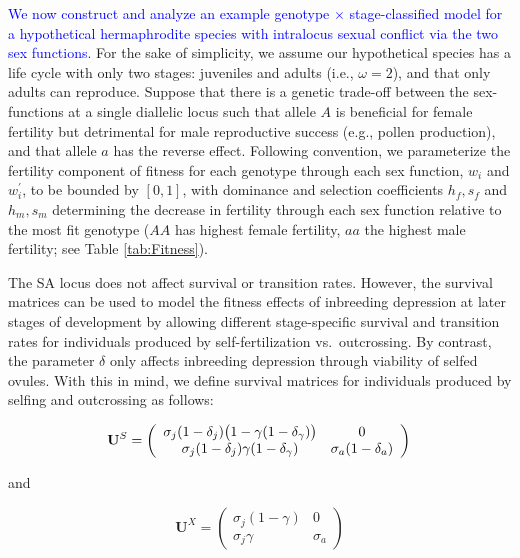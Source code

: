 \documentclass[11pt]{article}
\def\mbf#1{\mathbf{#1}}
\begin{document}
\textcolor{blue}{We now construct and analyze an example genotype $\times$ stage-classified model for a hypothetical hermaphrodite species with intralocus sexual conflict via the two sex functions.} For the sake of simplicity, we assume our hypothetical species has a life cycle with only two stages: juveniles and adults (i.e., $\omega = 2$), and that only adults can reproduce. Suppose that there is a genetic trade-off between the sex-functions at a single diallelic locus such that allele $A$ is beneficial for female fertility but detrimental for male reproductive success (e.g., pollen production), and that allele $a$ has the reverse effect. Following convention, we parameterize the fertility component of fitness for each genotype through each sex function, $w_{i}$ and $w^{\prime}_{i}$, to be bounded by $[0,1]$, with dominance and selection coefficients $h_f, s_f$ and $h_m, s_m$ determining the decrease in fertility through each sex function relative to the most fit genotype ($AA$ has highest female fertility, $aa$ the highest male fertility; see Table \ref{tab:Fitness}). 

The SA locus does not affect survival or transition rates. However, the survival matrices can be used to model the fitness effects of inbreeding depression at later stages of development by allowing different stage-specific survival and transition rates for individuals produced by self-fertilization vs.~outcrossing. By contrast, the parameter $\delta$ only affects inbreeding depression through viability of selfed ovules. With this in mind, we define survival matrices for individuals produced by selfing and outcrossing as follows:
\begin{linenomath*}
\begin{equation} \label{eq:US}
	\mbf{U}^S = \left(
					\begin{array}{cc}
						\sigma_j (1 - \delta_j) \big(1 - \gamma (1 - \delta_{\gamma}) \big) & 0 \\
						\sigma_j (1 - \delta_j) \gamma (1 - \delta_{\gamma})      & \sigma_a (1 - \delta_a)
					\end{array}
				\right) \\
\end{equation}
\end{linenomath*}
\noindent and 
\begin{linenomath*}
\begin{equation}\label{eq:UX}
	\mbf{U}^X = \left(
					\begin{array}{cc}
						\sigma_j(1 - \gamma) & 0 \\
						\sigma_j \gamma      & \sigma_a
					\end{array}
				\right)
\end{equation}
\end{linenomath*}
\end{document}
